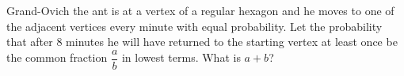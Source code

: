 Grand-Ovich the ant is at a vertex of a regular hexagon and he moves to one of the adjacent vertices every minute with equal probability. Let the probability that after $8$ minutes he will have returned to the starting vertex at least once be the common fraction $\dfrac{a}{b}$ in lowest terms. What is $a + b$?

